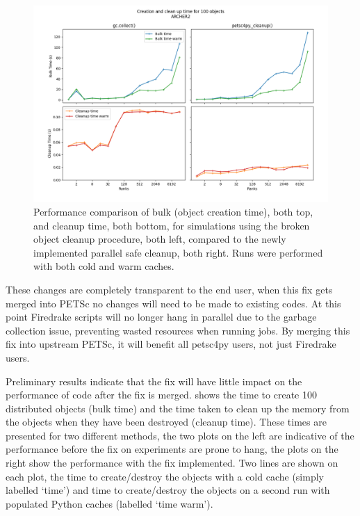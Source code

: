 \documentclass[a4paper,11pt]{article}
\begin{document}
\begin{figure}[htp]
	\centering
	\includegraphics[width=\textwidth]{D100BS128B_222.png}
	\vspace{-1em}
	\caption{Performance comparison of bulk (object creation time), both top, and cleanup time, both bottom, for simulations using the broken object cleanup procedure, both left, compared to the newly implemented parallel safe cleanup, both right. Runs were performed with both cold and warm caches.}
	\label{fig:perf_comp}
\end{figure}

These changes are completely transparent to the end user, when this fix gets merged into PETSc no changes will need to be made to existing codes.
At this point Firedrake scripts will no longer hang in parallel due to the garbage collection issue, preventing wasted resources when running jobs.
By merging this fix into upstream PETSc, it will benefit all petsc4py users, not just Firedrake users.

Preliminary results indicate that the fix will have little impact on the performance of code after the fix is merged.
 shows the time to create 100 distributed objects (bulk time) and the time taken to clean up the memory from the objects when they have been destroyed (cleanup time).
These times are presented for two different methods, the two plots on the left are indicative of the performance before the fix on experiments are prone to hang, the plots on the right show the performance with the fix implemented.
Two lines are shown on each plot, the time to create/destroy the objects with a cold cache (simply labelled `time') and time to create/destroy the objects on a second run with populated Python caches (labelled `time warm').
\end{document}
